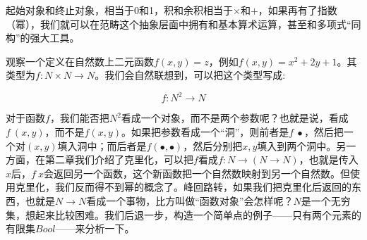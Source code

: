 \documentclass{article}
\begin{document}
起始对象和终止对象，相当于0和1，积和余积相当于$\times$和$+$，如果再有了指数（幂），我们就可以在范畴这个抽象层面中拥有和基本算术运算，甚至和多项式“同构”的强大工具。

观察一个定义在自然数上二元函数$f(x, y) = z$，例如$f(x, y) = x^2 + 2y + 1$。其类型为$f: N \times N \to N$。我们会自然联想到，可以把这个类型写成:

\[
f : N^2 \to N
\]

对于函数$f$，我们能否把$N^2$看成一个对象，而不是两个参数呢？也就是说，看成$f\ (x, y)$，而不是$f(x, y)$。如果把参数看成一个“洞”，则前者是$f\ \bullet$，然后把一个对$(x, y)$填入洞中；而后者是$f(\bullet, \bullet)$，然后分别把$x, y$填入到两个洞中。另一方面，在第二章我们介绍了克里化，可以把$f$看成$f: N \to (N \to N)$，也就是传入$x$后，$f\ x$会返回另一个函数，这个新函数把一个自然数映射到另一个自然数。但使用克里化，我们反而得不到幂的概念了。峰回路转，如果我们把克里化后返回的东西，也就是$N \to N$看成一个事物，比方叫做“函数对象”会怎样呢？$N$是一个无穷集，想起来比较困难。我们后退一步，构造一个简单点的例子——只有两个元素的有限集$Bool$——来分析一下。
\end{document}
